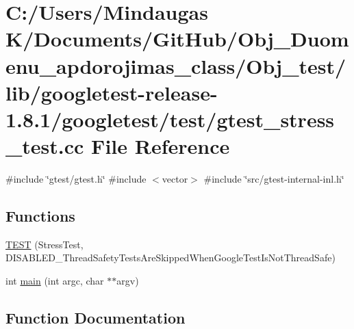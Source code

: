 \hypertarget{_obj__test_2lib_2googletest-release-1_88_81_2googletest_2test_2gtest__stress__test_8cc}{}\section{C\+:/\+Users/\+Mindaugas K/\+Documents/\+Git\+Hub/\+Obj\+\_\+\+Duomenu\+\_\+apdorojimas\+\_\+class/\+Obj\+\_\+test/lib/googletest-\/release-\/1.8.1/googletest/test/gtest\+\_\+stress\+\_\+test.cc File Reference}
\label{_obj__test_2lib_2googletest-release-1_88_81_2googletest_2test_2gtest__stress__test_8cc}
{\ttfamily \#include \char`\"{}gtest/gtest.\+h\char`\"{}}\newline
{\ttfamily \#include $<$vector$>$}\newline
{\ttfamily \#include \char`\"{}src/gtest-\/internal-\/inl.\+h\char`\"{}}\newline
\subsection*{Functions}
\begin{DoxyCompactItemize}
\item 
\mbox{\hyperlink{_obj__test_2lib_2googletest-release-1_88_81_2googletest_2test_2gtest__stress__test_8cc_ab463b16d4ea21758ce541b0f81e5c5d6}{T\+E\+ST}} (Stress\+Test, D\+I\+S\+A\+B\+L\+E\+D\+\_\+\+Thread\+Safety\+Tests\+Are\+Skipped\+When\+Google\+Test\+Is\+Not\+Thread\+Safe)
\item 
int \mbox{\hyperlink{_obj__test_2lib_2googletest-release-1_88_81_2googletest_2test_2gtest__stress__test_8cc_a3c04138a5bfe5d72780bb7e82a18e627}{main}} (int argc, char $\ast$$\ast$argv)
\end{DoxyCompactItemize}


\subsection{Function Documentation}
\mbox{\label{_obj__test_2lib_2googletest-release-1_88_81_2googletest_2test_2gtest__stress__test_8cc_a3c04138a5bfe5d72780bb7e82a18e627}} 
